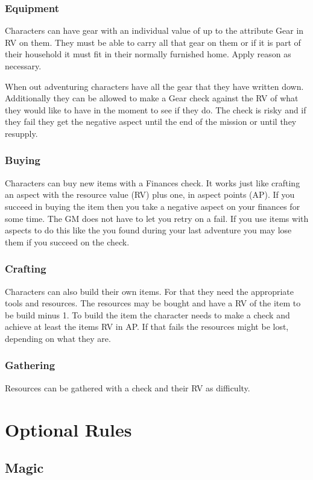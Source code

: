 \documentclass[11pt]{article}
\begin{document}
{\subsubsection{Equipment}
\label{sec:orge946d05}
Characters can have gear with an individual value of up to the attribute Gear in RV on them. They must be able to carry all that gear on them or if it is part of their household it must fit in their normally furnished home. Apply reason as necessary.

When out adventuring characters have all the gear that they have written down. Additionally they can be allowed to make a Gear check against the RV of what they would like to have in the moment to see if they do. The check is risky and if they fail they get the negative aspect  until the end of the mission or until they resupply.
\subsubsection{Buying}
\label{sec:orgb466e47}
Characters can buy new items with a Finances check. It works just like crafting an aspect with the resource value (RV) plus one, in aspect points (AP). If you succeed in buying the item then you take a negative aspect on your finances for some time. The GM does not have to let you retry on a fail. If you use items with aspects to do this like the  you found during your last adventure you may lose them if you succeed on the check.
\subsubsection{Crafting}
\label{sec:orgce91362}
Characters can also build their own items. For that they need the appropriate tools and resources. The resources may be bought and have a RV of the item to be build minus 1. To build the item the character needs to make a check and achieve at least the items RV in AP. If that fails the resources might be lost, depending on what they are.
\subsubsection{Gathering}
\label{sec:org86b2491}
Resources can be gathered with a check and their RV as difficulty.
\section{Optional Rules}
\label{sec:org9f698c2}
\subsection{Magic}
\label{sec:org47ce4e6}

}
\end{document}
